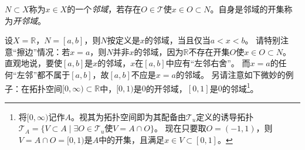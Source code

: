 \begin{definition}
$N \subset X$称为$x \in X$的一个\emph{邻域}，若存在$O \in \mathscr{T}$使$x \in O \subset N$。自身是邻域的开集称为\emph{开邻域}。  
\end{definition}

\begin{note}
设$X = \mathbb{R}$，$N = [a, b]$，则$N$按定义是$x$的邻域，当且仅当$a < x < b$。
请特别注意``擦边''情况：若$x = a$，则$N$并非$x$的邻域，因为$\mathbb{R}$不存在开集$O$使$x \in O \subset N$。
直观地说，要使$[a, b]$是$x$的邻域，$x$在$[a, b]$中应有``左邻右舍''。
而$x = a$的任何``左邻''都不属于$[a, b]$，故$[a, b]$不应是$x = a$的邻域。
另请注意如下微妙的例子：在拓扑空间$[0, \infty) \subset \mathbb{R}$中，$[0, 1)$是$0$的开邻域，$[0, 1]$是$0$的邻域\footnote{
将$[0, \infty)$记作$A$。视其为拓扑空间即为其配备由$\mathscr{T}_u$定义的诱导拓扑$\mathscr{T}_A = \{V \subset A \mid \exists O \in \mathscr{T}_u \text{使} V = A \cap O\}$。
现在只要取$O = (-1, 1)$，则$V = A \cap O = [0, 1)$是$A$中的开集，且满足$x \in V \subset [0, 1]$。
}。
\end{note}
